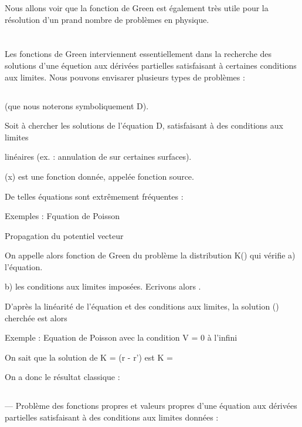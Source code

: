 Nous allons voir que la fonction de Green est également très
utile pour la résolution d'un prand nombre de problèmes en physique.

\section{}%

Les fonctions de Green interviennent essentiellement dans la
recherche des solutions d'une équetion aux dérivées partielles satisfaisant
à certaines conditions aux limites. Nous pouvons envisarer plusieurs types
de problèmes :

\subsection{}%
(que nous noterons symboliquement D).

Soit à chercher les solutions  de
l'équation D, satisfaisant à des conditions aux limites

linéaires (ex. : annulation de  sur certaines surfaces).

(x) est une fonction donnée, appelée fonction source.

De telles équations sont extrêmement fréquentes :

Exemples : Fquation de Poisson

Propagation du potentiel vecteur

On appelle alors fonction de Green du problème la distribution
K() qui vérifie
a) l'équation.

b) les conditions aux limites imposées.
Ecrivons alors .

D'après la linéarité de l'équation et des conditions aux
limites, la solution () cherchée est alors

Exemple : Equation de Poisson
avec la condition V = 0 à l'infini

On sait que la solution de K =  (r - r') est K = 

On a donc le résultat classique :

\subsection{}%

— Problème des fonctions propres et valeurs propres d'une
équation aux dérivées partielles satisfaisant à des conditions aux limites
données :

